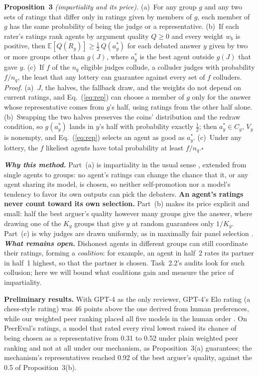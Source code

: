 \documentclass[12pt,letterpaper]{article}
\newcommand{\hd}[1]{\ifhmode\par\fi\addvspace{1pt}\noindent\textbf{#1}\hspace{0.35em}}
\newcommand{\slab}[1]{\textbf{\textit{#1}}}
\begin{document}
\textbf{Proposition~3} \textit{(impartiality and its price).} (a)~For any group $g$ and any two sets of ratings that differ only in ratings given by members of $g$, each member of $g$ has the same probability of being the judge or a representative. (b)~If each rater's ratings rank agents by argument quality $Q\ge0$ and every weight $w_b$ is positive, then $\mathbb{E}[Q(R_y)]\ge\frac12\,Q(a^*_y)$ for each debated answer $y$ given by two or more groups other than $g(J)$, where $a^*_y$ is the best agent outside $g(J)$ that gave $y$. (c)~If $f$ of the $n_q$ eligible judges collude, a colluder judges with probability $f/n_q$, the least that any lottery can guarantee against every set of $f$ colluders. \textit{Proof.} (a)~$J$, the halves, the fallback draw, and the weights do not depend on current ratings, and Eq.~(\ref{eq:rep}) can choose a member of $g$ only for the answer whose representative comes from $g$'s half, using ratings from the other half alone. (b)~Swapping the two halves preserves the coins' distribution and the redraw condition, so $g(a^*_y)$ lands in $y$'s half with probability exactly $\frac12$; then $a^*_y\in C_y$, $V_y$ is nonempty, and Eq.~(\ref{eq:rep}) selects an agent as good as $a^*_y$. (c)~Under any lottery, the $f$ likeliest agents have total probability at least $f/n_q$.\hfill$\square$

\slab{Why this method.} Part~(a) is impartiality in the usual sense \citep{holzman2013impartial,kurokawa2015impartial}, extended from single agents to groups: no agent's ratings can change the chance that it, or any agent sharing its model, is chosen, so neither self-promotion nor a model's tendency to favor its own outputs \citep{panickssery2024self} can pick the debaters. \textbf{An agent's ratings never count toward its own selection.} Part~(b) makes its price explicit and small: half the best arguer's quality however many groups give the answer, where drawing one of the $K_y$ groups that give $y$ at random guarantees only $1/K_y$. Part~(c) is why judges are drawn uniformly, as in maximally fair panel selection \citep{flanigan2021fair}. \slab{What remains open.} Dishonest agents in different groups can still coordinate their ratings, forming a \emph{coalition}: for example, an agent in half~2 rates its partner in half~1 highest, so that the partner is chosen. Task~2.2's audits look for such collusion; here we will bound what coalitions gain and measure the price of impartiality.

\hd{Preliminary results.} With GPT-4 as the only reviewer, GPT-4's Elo rating (a chess-style rating) was 46 points above the one derived from human preferences, while our weighted peer ranking placed all five models in the human order \citep{li2024prd}. On PeerEval's ratings, a model that rated every rival lowest raised its chance of being chosen as a representative from 0.31 to 0.52 under plain weighted peer ranking and not at all under our mechanism, as Proposition~3(a) guarantees; the mechanism's representatives reached 0.92 of the best arguer's quality, against the 0.5 of Proposition~3(b).
\end{document}
